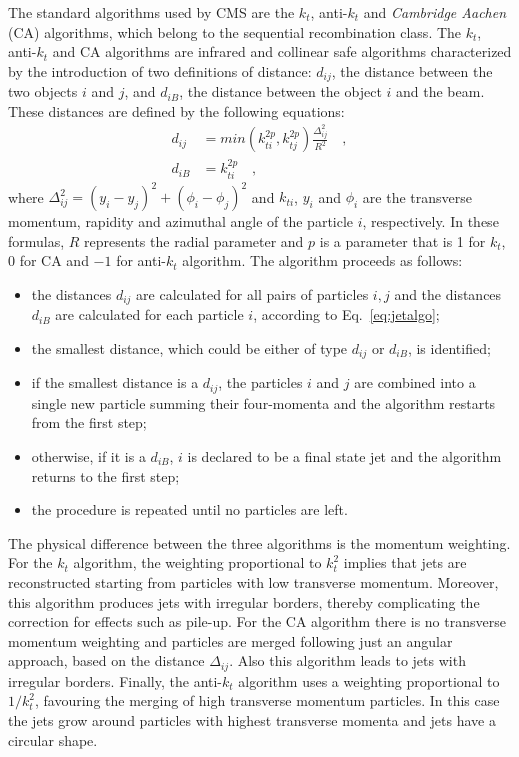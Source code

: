 The standard algorithms used by CMS are the $k_t$, anti-$k_t$ and \emph{Cambridge Aachen} (CA) algorithms, which belong to the sequential recombination class.
The $k_t$, anti-$k_t$ and CA algorithms are infrared and collinear safe algorithms characterized by the introduction of two definitions of distance: $d_{ij}$, the distance between the two objects $i$ and $j$, and $d_{iB}$, the distance between the object $i$ and the beam. These distances are defined by the following equations:
\begin{equation}\label{eq:jetalgo}
\begin{split}
d_{ij} &= min\left(k_{ti}^{2p}, k_{tj}^{2p} \right) \frac{\Delta_{ij}^2}{R^2} \quad,\\
d_{iB} &= k_{ti}^{2p} \quad,
\end{split}
\end{equation}
where $\Delta_{ij}^2 = (y_i - y_j)^2 + (\phi_i - \phi_j)^2$ and $k_{ti}$, $y_i$ and $\phi_i$ are the transverse momentum, rapidity and azimuthal angle of the particle $i$, respectively. In these formulas, $R$ represents the radial parameter and $p$ is a parameter that is 1 for $k_t$, 0 for CA and $-1$ for anti-$k_t$ algorithm. The algorithm proceeds as follows:
\begin{itemize}
\item the distances $d_{ij}$ are calculated for all pairs of particles $i,j$ and the distances $d_{iB}$ are calculated for each particle $i$, according to Eq.~\eqref{eq:jetalgo};
\item the smallest distance, which could be either of type $d_{ij}$ or $d_{iB}$, is identified;
\item if the smallest distance is a $d_{ij}$, the particles $i$ and $j$ are combined into a single new particle summing their four-momenta and the algorithm restarts from the first step;
\item otherwise, if it is a $d_{iB}$, $i$ is declared to be a final state jet and the algorithm returns to the first step;
\item the procedure is repeated until no particles are left.
\end{itemize}

The physical difference between the three algorithms is the momentum weighting. For the $k_t$ algorithm, the weighting proportional to $k_t^2$ implies that jets are reconstructed starting from particles with low transverse momentum. Moreover, this algorithm produces jets with irregular borders, thereby complicating the correction for effects such as pile-up. For the CA algorithm there is no transverse momentum weighting and particles are merged following just an angular approach, based on the distance $\Delta_{ij}$. Also this algorithm leads to jets with irregular borders. Finally, the anti-$k_t$ algorithm uses a weighting proportional to $1/k_t^2$, favouring the merging of high transverse momentum particles. In this case the jets grow around particles with highest transverse momenta and jets have a circular shape. 

